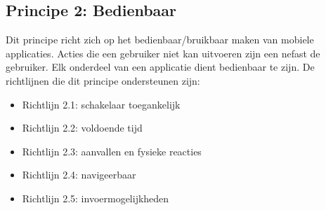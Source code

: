 \begin{table}[H]
\end{table}

\subsection{Principe 2: Bedienbaar}
\label{sec:bedienbaarWCAG}
Dit principe richt zich op het bedienbaar/bruikbaar maken van mobiele applicaties. Acties die een gebruiker niet kan uitvoeren zijn een nefast de gebruiker. Elk onderdeel van een applicatie dient bedienbaar te zijn. De richtlijnen die dit principe ondersteunen zijn: \begin{itemize}
    \item Richtlijn 2.1: schakelaar toegankelijk
    \item Richtlijn 2.2: voldoende tijd
    \item Richtlijn 2.3: aanvallen en fysieke reacties
    \item Richtlijn 2.4: navigeerbaar 
    \item Richtlijn 2.5: invoermogelijkheden
\end{itemize}
